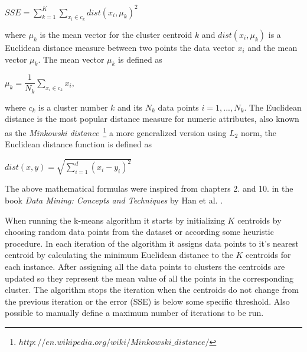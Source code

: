 \begin{center}
$SSE =\displaystyle \sum_{k=1}^{K}\displaystyle \sum_{x_i \in c_k}dist(x_i,\mu_k)^2$ 
\end{center}

where $\mu_k$ is the mean vector for the cluster centroid $k$ and $dist(x_i,\mu_k)$ is a Euclidean distance measure between two points the data vector $x_i$ and the mean vector $\mu_k$. The mean vector $\mu_k$ is defined as

\begin{center}
$\mu_k = \dfrac{1}{N_k}\displaystyle \sum_{x_i \in c_k}x_i,$ 
\end{center}

where $c_k$ is a cluster number $k$ and its $N_k$ data points $i=1,...,N_k$. The Euclidean distance is the most popular distance measure for numeric attributes, also known as the \textit{Minkowski distance}~\footnote{$http://en.wikipedia.org/wiki/Minkowski\_distance/$} a more generalized version using $L_2$ norm, the Euclidean distance function is defined as

\begin{center}
$dist(x,y) = \sqrt{\displaystyle \sum_{i=1}^{d}(x_i-y_i)^2} $
\end{center}

The above mathematical formulas were inspired from chapters 2. and 10. in the book \textit{Data Mining: Concepts and Techniques} by Han et al. \citep{Han:2006DM}. 

When running the k-means algorithm it starts by initializing $K$ centroids by choosing random data points from the dataset or according some heuristic procedure. In each iteration of the algorithm it assigns data points to it's nearest centroid by calculating the minimum Euclidean distance to the $K$ centroids for each instance. After assigning all the data points to clusters the centroids are updated so they represent the mean value of all the points in the corresponding cluster. The algorithm stops the iteration when the centroids do not change from the previous iteration or the error (SSE) is below some specific threshold. Also possible to manually define a maximum number of iterations to be run. 

